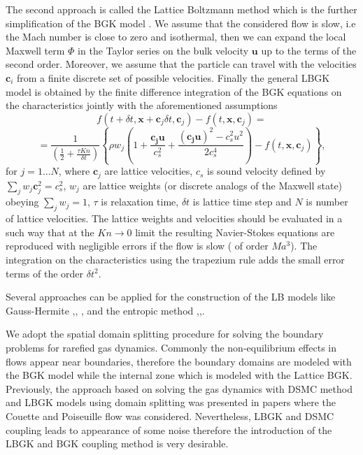 \documentclass[]{elsarticle} %
\begin{document}
{The  second  approach is  called the  Lattice Boltzmann method which is the further simplification of the BGK model \cite{Succi2001}. We assume that the considered flow is  slow,  i.e the  Mach number is  close  to zero and isothermal, then we  can expand  the local Maxwell term $\Phi$
in the Taylor series on the bulk velocity $\mathbf{u}$  up to the terms of the second order. Moreover, we assume that  the particle can travel with the  velocities $\mathbf{c}_i$ from a finite discrete set of possible velocities.
Finally the general LBGK model is  obtained  by the finite difference integration of the BGK equations on the  characteristics jointly with the aforementioned assumptions
$$
f(t+\delta t, \mathbf{x}+\mathbf{c}_j\delta t, \mathbf{c}_j)-f(t, \mathbf{x},\mathbf{c}_j)=
$$
\begin{equation}\label{lbgk}
=\frac{1}{(\frac{1}{2}+\frac{\tau Kn}{\delta t})}\left\{ \rho w_j\left(1+ \frac{\mathbf{c_j}\mathbf{u}}{c_s^2}+\frac{(\mathbf{c_j}\mathbf{u})^2-c_s^2u^2}{2c_s^4}\right)-f(t,\mathbf{x}, \mathbf{c}_j) \right \},
\end{equation}
for $j=1\ldots N$, where $\mathbf{c}_j$ are lattice velocities, $c_s$  is  sound velocity defined by $\sum_jw_j\mathbf{c}^2_j=c_s^2$, $w_j$ are  lattice weights (or discrete analogs of the Maxwell state) obeying $\sum_jw_j=1$, $\tau$  is  relaxation time, $\delta t$  is lattice  time step and  $N$  is number of lattice velocities. The  lattice weights and  velocities should be evaluated in a such way that at the $Kn \rightarrow 0$ limit the resulting Navier-Stokes equations  are reproduced with negligible  errors if the flow is slow ( of order $Ma^3$). The integration on  the  characteristics using the trapezium rule adds the small error terms of the  order  $\delta t^2$.


Several approaches can be applied for the  construction of the LB models like Gauss-Hermite \cite{He1997},\cite{Shan1998}, \cite{Shan2006},\cite{Shan2010} and the entropic  method \cite{Karlin1999},\cite{Chikatamarla2006},\cite{Chikatamarla2009}.

We adopt the spatial domain splitting procedure  for solving  the  boundary problems  for  rarefied gas dynamics.
Commonly the  non-equilibrium effects in flows appear near boundaries, therefore the  boundary domains are modeled with the BGK model while the internal  zone which is modeled with the Lattice BGK. Previously, the  approach based on solving  the gas  dynamics with DSMC method and LBGK models using  domain splitting was presented in papers \cite{Staso2016short, Staso2016long} where  the Couette and  Poiseuille  flow  was  considered. Nevertheless, LBGK and DSMC coupling leads to appearance  of some  noise \cite{Staso2016short} therefore the  introduction of the LBGK and  BGK coupling  method  is  very desirable.



}
\end{document}
